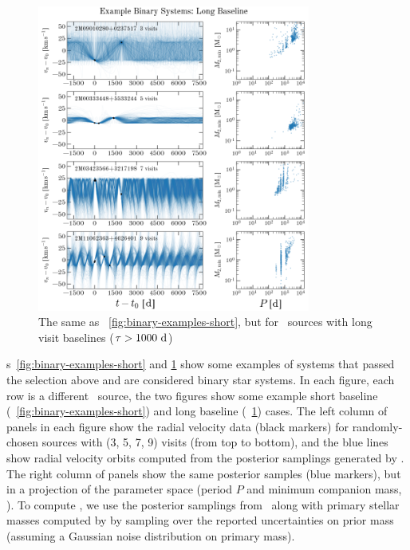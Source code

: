 \documentclass[modern]{aastex63}
\begin{document}
\begin{figure}[!t]
    \begin{center}
    \includegraphics[width=0.8\textwidth]{example-binaries-long-placeholder.png}
    \end{center}
    \caption{%
    The same as \figurename~\ref{fig:binary-examples-short}, but for \apogee\
    sources with long visit baselines ($\tau > 1000~\mathrm{d}$)
    \label{fig:binary-examples-long}
    }
\end{figure}

\figurename s~\ref{fig:binary-examples-short} and
\ref{fig:binary-examples-long} show some examples of systems that passed the
selection above and are considered binary star systems.
In each figure, each row is a different \apogee\ source, the two figures show
some example short baseline (\figurename~\ref{fig:binary-examples-short}) and
long baseline (\figurename~\ref{fig:binary-examples-long}) cases.
The left column of panels in each figure show the radial velocity data (black
markers) for randomly-chosen sources with (3, 5, 7, 9) visits (from top to
bottom), and the blue lines show radial velocity orbits computed from the
posterior samplings generated by \thejoker.
The right column of panels show the same posterior samples (blue markers), but
in a projection of the parameter space (period $P$ and minimum companion mass,
\mtwomin).
To compute \mtwomin, we use the posterior samplings from \thejoker\ along with
primary stellar masses computed by \citet{Queiroz:2019} by sampling over the
reported uncertainties on prior mass (assuming a Gaussian noise distribution on
primary mass).
\end{document}
